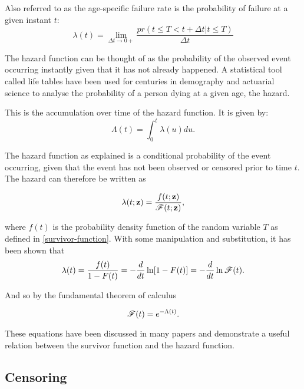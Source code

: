 \begin{definition}
Also referred to as the age-specific failure rate is the probability of failure at a given instant $t$:
\begin{equation}
    \lambda(t)=\lim_{\Delta t \xrightarrow{} 0+}\frac{pr(t\leq T < t+\Delta t | t\leq T)}{\Delta t}
\end{equation}
\end{definition}

The hazard function can be thought of as the probability of the observed event occurring instantly given that it has not already happened. A statistical tool called life tables have been used for centuries in demography and actuarial science to analyse the probability of a person dying at a given age, the hazard.

\begin{definition}
This is the accumulation over time of the hazard function. It is given by:
\begin{equation}
    \Lambda(t)=\int_0^t \lambda(u)du.
\end{equation}
\end{definition}

The hazard function as explained is a conditional probability of the event occurring, given that the event has not been observed or censored prior to time $t$. The hazard can therefore be written as

\begin{equation}\label{hazard-function}
    \lambda(t;\textbf{z}) = \frac{f(t;\textbf{z})}{\mathscr{F}(t;\textbf{z})},
\end{equation}

where $f(t)$ is the probability density function of the random variable $T$ as defined in \ref{survivor-function}. With some manipulation and substitution, it has been shown that
\begin{equation}
    \lambda(t) = \frac{f(t)}{1-F(t)}
    = -\frac{d}{dt}\ln[1-F(t)]
    = -\frac{d}{dt}\ln\mathscr{F}(t).
\end{equation}

And so by the fundamental theorem of calculus

\begin{equation}
    \mathscr{F}(t) = e^{-\Lambda(t)}.
\end{equation}

These equations have been discussed in many papers and demonstrate a useful relation between the survivor function and the hazard function.

\subsection{Censoring}

